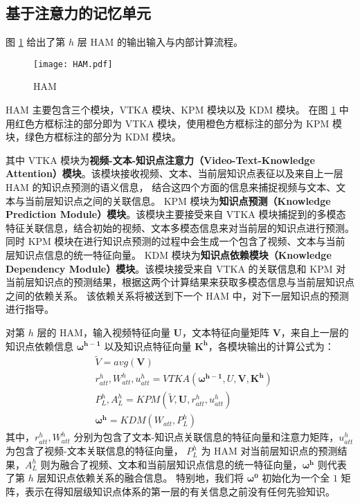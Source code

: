 \subsection{基于注意力的记忆单元}
    图 \ref{fig3.2} 给出了第 $h$ 层 HAM 的输出输入与内部计算流程。

    \begin{figure}[t]
        \centering
        \texttt{[image: HAM.pdf]}
        \caption{HAM}
        \label{fig3.2}
    \end{figure}

    HAM 主要包含三个模块，VTKA 模块、KPM 模块以及 KDM 模块。
    在图 \ref{fig3.2} 中用红色方框标注的部分即为 VTKA 模块，使用橙色方框标注的部分为 KPM 模块，绿色方框标注的部分为 KDM 模块。

    其中 VTKA 模块为\textbf{视频-文本-知识点注意力（Video-Text-Knowledge Attention）模块}。该模块接收视频、文本、当前层知识点表征以及来自上一层 HAM 的知识点预测的语义信息，
    结合这四个方面的信息来捕捉视频与文本、文本与当前层知识点之间的关联信息。
    KPM 模块为\textbf{知识点预测（Knowledge Prediction Module）模块}。该模块主要接受来自 VTKA 模块捕捉到的多模态特征关联信息，结合初始的视频、文本多模态信息来对当前层的知识点进行预测。
    同时 KPM 模块在进行知识点预测的过程中会生成一个包含了视频、文本与当前层知识点信息的统一特征向量。
    KDM 模块为\textbf{知识点依赖模块（Knowledge Dependency Module）模块}。该模块接受来自 VTKA 的关联信息和 KPM 对当前层知识点的预测结果，根据这两个计算结果来获取多模态信息与当前层知识点之间的依赖关系。
    该依赖关系将被送到下一个 HAM 中，对下一层知识点的预测进行指导。

    对第 $h$ 层的 HAM，输入视频特征向量 $\boldsymbol{U}$，文本特征向量矩阵 $\boldsymbol{V}$，来自上一层的知识点依赖信息 $\boldsymbol{\omega^{h - 1}}$ 以及知识点特征向量 $\boldsymbol{K^h}$，各模块输出的计算公式为：
    \begin{equation}
        \begin{aligned}
            &\tilde{V} = avg\left(\boldsymbol{V}\right) \\
            &r_{att}^h, W_{att}^h, u_{att}^h = VTKA\left(\boldsymbol{\omega^{h - 1}}, U, \boldsymbol{V}, \boldsymbol{K^h}\right) \\
            &P_L^h, A_L^h = KPM\left(\tilde{V}, \boldsymbol{U}, r_{att}^h, u_{att}^h\right) \\
            &\boldsymbol{\omega^h} = KDM\left(W_{att}, P_L^h\right)
        \end{aligned}
    \end{equation}
    其中，$r_{att}^{h}, W_{att}^h$ 分别为包含了文本-知识点关联信息的特征向量和注意力矩阵，$u_{att}^h$ 为包含了视频-文本关联信息的特征向量，
    $P_L^h$ 为 HAM 对当前层知识点的预测结果，$A_L^h$ 则为融合了视频、文本和当前层知识点信息的统一特征向量，$\boldsymbol{\omega^h}$ 则代表了第 $h$ 层知识点依赖关系的融合信息。
    特别地，我们将 $\boldsymbol{\omega^0}$ 初始化为一个全 $1$ 矩阵，表示在得知层级知识点体系的第一层的有关信息之前没有任何先验知识。

